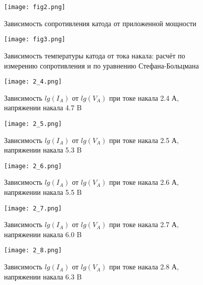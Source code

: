 \documentclass[a4paper]{article}
\begin{document}
\newpage


\begin{figure}[h]
\begin{center}
\texttt{[image: fig2.png]}
\caption{Зависимость сопротивления катода от приложенной мощности}
\end{center}
\end{figure}

\begin{figure}[h]
\begin{center}
\texttt{[image: fig3.png]}
\caption{Зависимость температуры катода от тока накала: расчёт по измерению сопротивления и по уравнению Стефана-Больцмана}
\end{center}
\end{figure}

\begin{figure}[h]
\begin{center}
\texttt{[image: 2\_4.png]}
\caption{Зависимость $lg(I_A)$ от $lg(V_A)$ при токе накала 2.4 А, напряжении накала 4.7 B}
\end{center}
\end{figure}

\begin{figure}[h]
\begin{center}
\begin{minipage}[h]{0.45\linewidth}
\texttt{[image: 2\_5.png]}
\caption{Зависимость $lg(I_A)$ от $lg(V_A)$ при токе накала 2.5 А, напряжении накала 5.3 B}
\end{minipage}
\hfill 
\begin{minipage}[h]{0.45\linewidth}
\texttt{[image: 2\_6.png]}
\caption{Зависимость $lg(I_A)$ от $lg(V_A)$ при токе накала 2.6 А, напряжении накала 5.5 B }
\end{minipage}
\end{center}
\end{figure}

\begin{figure}[h]
\begin{center}
\begin{minipage}[h]{0.45\linewidth}
\texttt{[image: 2\_7.png]}
\caption{Зависимость $lg(I_A)$ от $lg(V_A)$ при токе накала 2.7 А, напряжении накала 6.0 B}
\end{minipage}
\hfill 
\begin{minipage}[h]{0.45\linewidth}
\texttt{[image: 2\_8.png]}
\caption{Зависимость $lg(I_A)$ от $lg(V_A)$ при токе накала 2.8 А, напряжении накала 6.3 B }
\end{minipage}
\end{center}
\end{figure}
\end{document}
